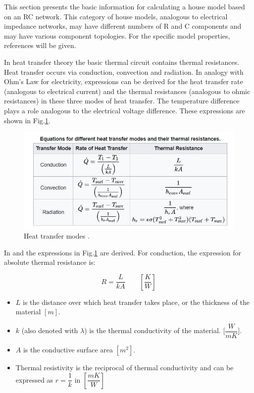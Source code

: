 This section presents the basic information for calculating a house model based on an RC network. This category of house models, analogous to electrical impedance networks, may have different numbers of R and C components and may have various component topologies. For the specific model properties, references will be given.

In heat transfer theory the basic thermal circuit contains thermal resistances. Heat transfer occurs via conduction, convection and radiation. In analogy with Ohm's Law for electricity, expressions can be derived for the heat transfer rate (analogous to electrical current) and the thermal resistances (analogous to ohmic resistances) in these three modes of heat transfer. The temperature difference plays a role analogous to the electrical voltage difference. These expressions are shown in Fig.\ref{fig:lumped_table}.
\begin{figure}[H]
	\centering
	\includegraphics[width=0.6\columnwidth]{Figures/heat transfer mode.JPG}
	\caption[Short title]{Heat transfer modes \cite{GIGO}.}
	\label{fig:lumped_table}
\end{figure}
\newpage

In \cite{HTTHERMO} and \cite{FUND} the expressions in Fig.\ref{fig:lumped_table} are derived.
For conduction, the expression for absolute thermal resistance is:  

\begin{equation}
	R = \frac{L}{kA} \qquad \left[ \frac{K}{W} \right]
\end{equation}

\begin{itemize}
    \item $L$ is the distance over which heat transfer takes place, or the thickness of the material $[m]$.
    \item $k$ (also denoted with $\lambda$) is the thermal conductivity of the material. [$\dfrac{W}{mK}$]. 
    \item $A$ is the conductive surface area  $[m^2]$.
    \item Thermal resistivity is the reciprocal of thermal conductivity and can be expressed as $r =\dfrac{1}{k}$  in $[\dfrac{mK}{W}]$

\end{itemize}

